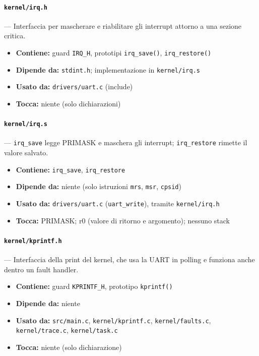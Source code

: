 \paragraph{\texttt{kernel/irq.h}} --- Interfaccia per mascherare e riabilitare gli interrupt attorno a una sezione critica.
\begin{itemize}
  \item \textbf{Contiene:} guard \texttt{IRQ\_H}, prototipi \texttt{irq\_save()}, \texttt{irq\_restore()}
  \item \textbf{Dipende da:} \texttt{stdint.h}; implementazione in \texttt{kernel/irq.s}
  \item \textbf{Usato da:} \texttt{drivers/uart.c} (include)
  \item \textbf{Tocca:} niente (solo dichiarazioni)
\end{itemize}

\paragraph{\texttt{kernel/irq.s}} --- \texttt{irq\_save} legge PRIMASK e maschera gli interrupt; \texttt{irq\_restore} rimette il valore salvato.
\begin{itemize}
  \item \textbf{Contiene:} \texttt{irq\_save}, \texttt{irq\_restore}
  \item \textbf{Dipende da:} niente (solo istruzioni \texttt{mrs}, \texttt{msr}, \texttt{cpsid})
  \item \textbf{Usato da:} \texttt{drivers/uart.c} (\texttt{uart\_write}), tramite \texttt{kernel/irq.h}
  \item \textbf{Tocca:} PRIMASK; r0 (valore di ritorno e argomento); nessuno stack
\end{itemize}

\paragraph{\texttt{kernel/kprintf.h}} --- Interfaccia della print del kernel, che usa la UART in polling e funziona anche dentro un fault handler.
\begin{itemize}
  \item \textbf{Contiene:} guard \texttt{KPRINTF\_H}, prototipo \texttt{kprintf()}
  \item \textbf{Dipende da:} niente
  \item \textbf{Usato da:} \texttt{src/main.c}, \texttt{kernel/kprintf.c}, \texttt{kernel/faults.c}, \texttt{kernel/trace.c}, \texttt{kernel/task.c}
  \item \textbf{Tocca:} niente (solo dichiarazione)
\end{itemize}

